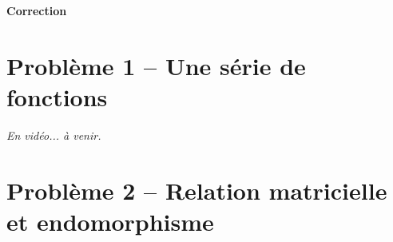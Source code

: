 \documentclass[twoside,french,11pt]{VcCours}
\begin{document}

\begin{center}
\large\bf
Correction
\end{center}
\separationTitre


\section*{Problème 1 -- Une série de fonctions} %
\emph{En vidéo... à venir.}


\section*{Problème 2 -- Relation matricielle et endomorphisme}
\end{document}
